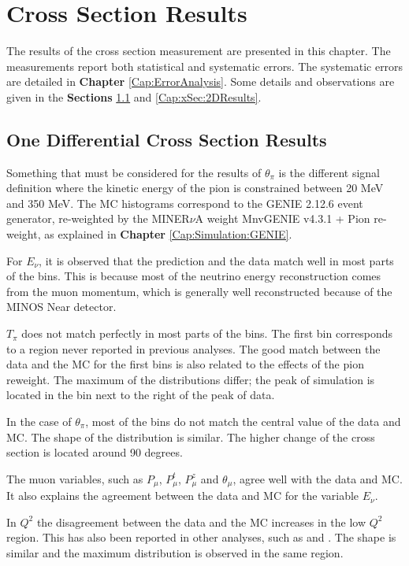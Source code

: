 \chapter{Cross Section Results}
\minitoc
\label{Cap:xSec}

The results of the cross section measurement are presented in this chapter. The measurements report both statistical and systematic errors. The systematic errors are detailed in \textbf{Chapter} \ref{Cap:ErrorAnalysis}. Some details and observations are given in the \textbf{Sections} \ref{Cap:xSec:1DResults} and \ref{Cap:xSec:2DResults}.

\section{One Differential Cross Section Results}
\label{Cap:xSec:1DResults}

Something that must be considered for the results of $\theta_\pi$ is the different signal definition where the kinetic energy of the pion is constrained between 20 MeV and 350 MeV. The MC histograms correspond to the GENIE 2.12.6 event generator, re-weighted by the MINER$\nu$A weight MnvGENIE v4.3.1 + Pion re-weight, as explained in \textbf{Chapter} \ref{Cap:Simulation:GENIE}.

For $E_\nu$, it is observed that the prediction and the data match well in most parts of the bins. This is because most of the neutrino energy reconstruction comes from the muon momentum, which is generally well reconstructed because of the MINOS Near detector.

$T_\pi$ does not match perfectly in most parts of the bins. The first bin corresponds to a region never reported in previous analyses. The good match between the data and the MC for the first bins is also related to the effects of the pion reweight. The maximum of the distributions differ; the peak of simulation is located in the bin next to the right of the peak of data. 

In the case of $\theta_\pi$, most of the bins do not match the central value of the data and MC. The shape of the distribution is similar. The higher change of the cross section is located around 90 degrees. 

The muon variables, such as $P_\mu$, $P^t_\mu$, $P^z_\mu$ and $\theta_\mu$, agree well with the data and MC. It also explains the agreement between the data and MC for the variable $E_\nu$. 

In $Q^2$ the disagreement between the data and the MC increases in the low $Q^2$ region. This has also been reported in other analyses, such as \cite{Bercellie.131.011801} and \cite{Eberly:2014mra}. The shape is similar and the maximum distribution is observed in the same region.

